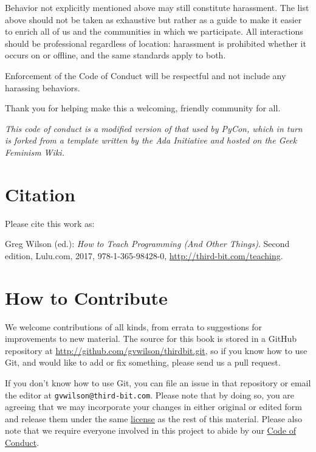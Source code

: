 \documentclass[10pt,statementpaper]{memoir}
\begin{document}
Behavior not explicitly mentioned above may still constitute harassment.
The list above should not be taken as exhaustive but rather as a guide
to make it easier to enrich all of us and the communities in which we
participate. All interactions should be professional regardless of
location: harassment is prohibited whether it occurs on or offline, and
the same standards apply to both.

Enforcement of the Code of Conduct will be respectful and not include
any harassing behaviors.

Thank you for helping make this a welcoming, friendly community for all.

\emph{This code of conduct is a modified version of that used by PyCon,
which in turn is forked from a template written by the Ada Initiative
and hosted on the Geek Feminism Wiki.}

\chapter{Citation}\label{citation}

Please cite this work as:

\vspace*{\baselineskip}

\noindent
Greg Wilson (ed.): \emph{How to Teach Programming (And Other Things)}.
Second edition, Lulu.com, 2017, 978-1-365-98428-0,
\url{http://third-bit.com/teaching}.

\chapter{How to Contribute}\label{how-to-contribute}

We welcome contributions of all kinds, from errata to suggestions for
improvements to new material. The source for this book is stored in a
GitHub repository at \url{http://github.com/gvwilson/thirdbit.git}, so
if you know how to use Git, and would like to add or fix something,
please send us a pull request.

If you don't know how to use Git, you can file an issue in that
repository or email the editor at \texttt{gvwilson@third-bit.com}.
Please note that by doing so, you are agreeing that we may incorporate
your changes in either original or edited form and release them under
the same \href{/license/}{license} as the rest of this material. Please
also note that we require everyone involved in this project to abide by
our \href{conduct.html}{Code of Conduct}.
\end{document}
